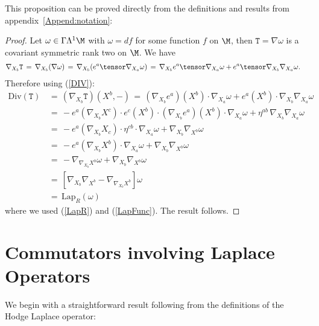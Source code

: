 \documentclass[sections]{tjwNOTES}
\newcommand{\LapR}{\text{Lap}_{R}}
\newcommand{\Div}{\text{Div}}
\begin{document}
This proposition can be proved directly from the definitions and results from appendix~\ref{Append:notation}:\\

\begin{proof}
	Let $\omega\in\Gamma\Lambda^{1}\M$ with $\omega=df$ for some function $f$ on $\M$, then $\texttt{T}=\nabla\omega$ is a covariant symmetric rank two on $\M$. We have
	\begin{align*}
		\nabla_{X_{b}}\texttt{T} \,=\, \nabla_{X_{b}}(\nabla\omega) &\,=\, \nabla_{X_{b}}(e^{a} \tensor \nabla_{X_{a}}\omega) \,=\, \nabla_{X_{b}}e^{a} \tensor \nabla_{X_{a}}\omega + e^{a} \tensor \nabla_{X_{b}}\nabla_{X_{a}}\omega.
	\end{align*}
	Therefore using (\ref{DIV}):
	\begin{align*}
		\Div(\texttt{T}) &\,=\,  (\nabla_{X_{b}}\texttt{T})(X^{b},-) \,=\, (\nabla_{X_{b}}e^{a})(X^{b}) \cdot \nabla_{X_{a}}\omega + e^{a}(X^{b})\cdot \nabla_{X_{b}}\nabla_{X_{a}}\omega \\[0.2cm]
		&\,=\, -e^{a}(\nabla_{X_{b}}X^{c})\cdot e^{c}(X^{b})\cdot(\nabla_{X_{b}}e^{a})(X^{b}) \cdot \nabla_{X_{a}}\omega + \eta^{ab}\,\nabla_{X_{b}}\nabla_{X_{a}}\omega \\[0.2cm]
		&\,=\, -e^{a}(\nabla_{X_{b}}X_{c})\cdot \eta^{cb} \cdot \nabla_{X_{a}}\omega + \nabla_{X_{b}}\nabla_{X^{b}}\omega \\[0.2cm]
		&\,=\, -e^{a}(\nabla_{X_{b}}X^{b}) \cdot \nabla_{X_{a}}\omega + \nabla_{X_{b}}\nabla_{X^{b}}\omega \\[0.2cm]
		&\,=\, -\nabla_{\nabla_{X_{b}}X^{b}}\omega + \nabla_{X_{b}}\nabla_{X^{b}}\omega \\[0.2cm]
		&\,=\, \left[\nabla_{X_{b}}\nabla_{X^{b}} -\nabla_{\nabla_{X_{b}}X^{b}}\right]\omega \\[0.2cm]
		&\,=\, \LapR(\omega)
	\end{align*}
	where we used (\ref{LapR}) and (\ref{LapFunc}). The result follows.
\end{proof}



\section{Commutators involving Laplace Operators}
We begin with a straightforward result following from the definitions of the Hodge Laplace operator:\\[0.2cm]
\end{document}
